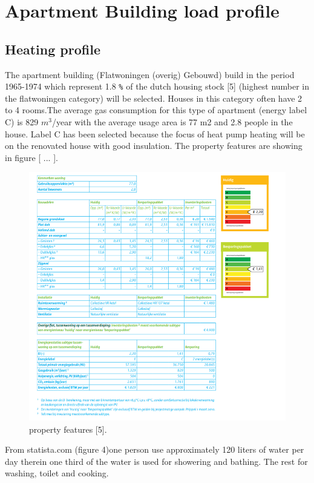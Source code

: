 \documentclass[a4paper,10pt]{article}
\begin{document}
\section{Apartment Building load profile}
\subsection{Heating profile}

The apartment building (Flatwoningen (overig) Gebouwd) build in the period 1965-1974 which represent 1.8 \texttt{\%} of the dutch housing stock [5] (highest number in the flatwoningen category) will be selected. Houses in this category often have 2 to 4 rooms.The average gas consumption for this type of apartment (energy label C) is 829 $m^3$/year with the average usage area is 77 m2 and 2.8 people in the house. Label C has been selected because the focus of heat pump heating will be on the renovated house with good insulation. The property features are showing in figure [  ... ].

\begin{figure}[H]
\centering
\includegraphics[width=1\columnwidth]{pictures/property features.png}
\caption[Short title]{property features [5].}
\label{fig:ff3}\end{figure}


From statista.com (figure 4)one person use approximately 120 liters of water per day therein one third of the water is used for showering and bathing. The rest for washing, toilet and cooking.
\end{document}
